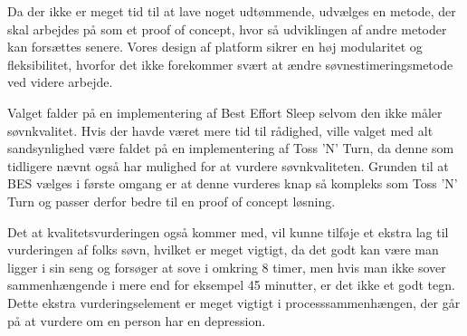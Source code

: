 Da der ikke er meget tid til at lave noget udtømmende, udvælges en metode, der skal arbejdes på som et proof of concept, hvor så udviklingen af andre metoder kan forsættes senere.
Vores design af platform sikrer en høj modularitet og fleksibilitet, hvorfor det ikke forekommer svært at ændre søvnestimeringsmetode ved videre arbejde.

Valget falder på en implementering af Best Effort Sleep selvom den ikke måler søvnkvalitet.
Hvis der havde været mere tid til rådighed, ville valget med alt sandsynlighed være faldet på en implementering af Toss 'N' Turn, da denne som tidligere nævnt også har mulighed for at vurdere søvnkvaliteten.
Grunden til at BES vælges i første omgang er at denne vurderes knap så kompleks som Toss 'N' Turn og passer derfor bedre til en proof of concept løsning.

Det at kvalitetsvurderingen også kommer med, vil kunne tilføje et ekstra lag til vurderingen af folks søvn, hvilket er meget vigtigt, da det godt kan være man ligger i sin seng og forsøger at sove i omkring 8 timer, men hvis man ikke sover sammenhængende i mere end for eksempel 45 minutter, er det ikke et godt tegn.
Dette ekstra vurderingselement er meget vigtigt i processsammenhængen, der går på at vurdere om en person har en depression. 